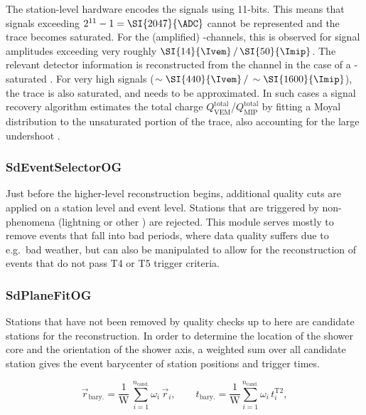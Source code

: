 The station-level hardware encodes the \PMT signals using 11-bits. This means 
that signals exceeding $2^{11}-1 = \SI{2047}{\ADC}$ cannot be represented and 
the trace becomes saturated. For the (amplified) \HG-channels, this is observed
for signal amplitudes exceeding very roughly 
$\SI{14}{\Ivem}\,/\,\SI{50}{\Imip}$. The relevant detector information is 
reconstructed from the \LG channel in the case of a \HG-saturated \PMT. For
very high signals ($\sim\SI{440}{\Ivem}\,/\,\sim\SI{1600}{\Imip}$), the \LG
trace is also saturated, and needs to be approximated. In such cases a signal 
recovery algorithm \cite{vebericEstimationSignalSaturated2013} estimates the 
total charge $Q^\mathrm{total}_\mathrm{VEM}$/$Q^\mathrm{total}_\mathrm{MIP}$ by
fitting a Moyal distribution \cite{moyalXXXTheoryIonization1955} to the 
unsaturated portion of the \PMT trace, also accounting for the large \PMT 
undershoot \cite{vebericEstimationSignalSaturated2013}.

\subsubsection{SdEventSelectorOG}

Just before the higher-level reconstruction begins, additional quality cuts are
applied on a station level and event level. Stations that are triggered by 
non-\EAS phenomena (lightning or other \TLEs 
\cite{mussaMultipleELVESOther2025}) are rejected. This module serves mostly to 
remove events that fall into bad periods, where data quality suffers due to 
e.g.\ bad weather, but can also be manipulated to allow for the reconstruction 
of events that do not pass T4 or T5 trigger criteria.

\subsubsection{SdPlaneFitOG}
\label{sssec:reconstruction-plane-fit}

Stations that have not been removed by quality checks up to here are candidate
stations for the \EAS reconstruction. In order to determine the location of the
shower core and the orientation of the shower axis, a weighted sum over all
candidate station gives the event barycenter of station positions and \TTWO 
trigger times.

\begin{equation}
	\vec{r}_\mathrm{bary.} = \frac{1}{\mathrm{W}}\,\sum\limits_{i=1}^{n_\mathrm{cand.}} \omega_i\,\vec{r}_i,\qquad t_\mathrm{bary.} = \frac{1}{\mathrm{W}} \sum\limits_{i=1}^{n_\mathrm{cand.}} \omega_i\,t^\mathrm{T2}_i,
\end{equation}

